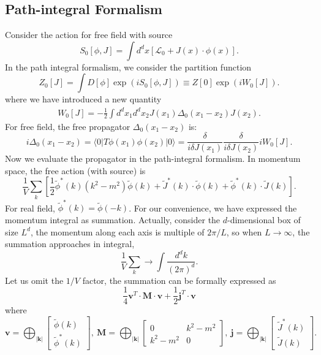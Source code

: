 \subsection{Path-integral Formalism}
Consider the action for free field with source
\begin{equation}
	S_0[\phi,J]
	= \int d^dx\left[\mathcal{L}_0 + J(x)\cdot\phi(x) \right].
\end{equation}
In the path integral formalism, we consider the partition function 
\begin{equation}
	Z_0[J] = \int D[\phi] \exp(iS_0[\phi,J])
	\equiv Z[0] \exp(iW_0[J]).
\end{equation}
where we have introduced a new quantity
\begin{equation}
\begin{aligned}
	W_0[J] = -\frac{1}{2}\int d^dx_1 d^dx_2 J(x_1)\Delta_0(x_1-x_2)J(x_2).
\end{aligned}
\end{equation}
For free field, the free propagator $\Delta_0(x_1-x_2)$ is:
\begin{equation}
	i\Delta_0(x_1-x_2) = \langle 0| T\phi(x_1)\phi(x_2)|0\rangle
	= \frac{\delta}{i\delta J(x_1)}\frac{\delta}{i\delta J(x_2)} iW_0[J].
\end{equation}
Now we evaluate the propagator in the path-integral formalism.
In momentum space, the free action (with source) is 
\begin{equation*}
	\frac{1}{V}\sum_k \left[\frac{1}{2}\tilde\phi^*(k)( k^2-m^2)\tilde\phi(k)+\tilde J^*(k)\cdot\tilde\phi(k)+\tilde\phi^*(k)\cdot\tilde J(k)\right].
\end{equation*}
For real field, $\tilde\phi^*(k) = \tilde\phi(-k)$.
For our convenience, we have expressed the momentum integral as summation.
Actually, consider the $d$-dimensional box of size $L^d$, the momentum along each axis is multiple of $2\pi/L$, so when $L\rightarrow \infty$, the summation approaches in integral,
\begin{equation*}
	\frac{1}{V}\sum_k \rightarrow \int \frac{d^d k}{(2\pi)^d}.
\end{equation*}
Let us omit the $1/V$ factor, the summation can be formally expressed as
\begin{equation}
	\frac{1}{4}\mathbf{v}^T \cdot \mathbf M\cdot \mathbf{v} + \frac{1}{2}\mathbf{j}^T \cdot \mathbf{v}
\end{equation}
where
\begin{equation*}
	\mathbf v = \bigoplus_{|\mathbf k|} \left[
	\begin{array}{c}
		\tilde{\phi}(k) \\ 
		\tilde{\phi}^*(k) 
	\end{array}\right],\ 
	\mathbf M = \bigoplus_{|\mathbf k|} \left[
	\begin{array}{cc} 
		0 & k^2-m^2 \\ 
		k^2-m^2 & 0 
	\end{array}\right],\ 
	\mathbf j = \bigoplus_{|\mathbf k|} \left[
	\begin{array}{c}
		\tilde{J}^*(k) \\ 
		\tilde{J}(k) 
	\end{array}\right].
\end{equation*}
